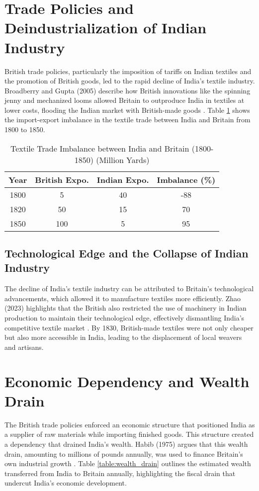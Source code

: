 \documentclass[9pt,twocolumn,twoside]{opticajnl}
\begin{document}
\section{Trade Policies and Deindustrialization of Indian Industry}
British trade policies, particularly the imposition of tariffs on Indian textiles and the promotion of British goods, led to the rapid decline of India’s textile industry. Broadberry and Gupta (2005) describe how British innovations like the spinning jenny and mechanized looms allowed Britain to outproduce India in textiles at lower costs, flooding the Indian market with British-made goods \cite{broadberry2005cotton}. Table \ref{table:textile_trade} shows the import-export imbalance in the textile trade between India and Britain from 1800 to 1850.

\begin{table}[h!]
\centering
\begin{tabular}{|c|c|c|c|}
\hline
\textbf{Year} & \textbf{British Expo.} & \textbf{Indian Expo.} & \textbf{Imbalance (\%)} \\
\hline
1800 & 5 & 40 & -88 \\
1820 & 50 & 15 & 70 \\
1850 & 100 & 5 & 95 \\
\hline
\end{tabular}
\caption{Textile Trade Imbalance between India and Britain (1800-1850) (Million Yards)}
\label{table:textile_trade}
\end{table}

\subsection{Technological Edge and the Collapse of Indian Industry}
The decline of India’s textile industry can be attributed to Britain’s technological advancements, which allowed it to manufacture textiles more efficiently. Zhao (2023) highlights that the British also restricted the use of machinery in Indian production to maintain their technological edge, effectively dismantling India’s competitive textile market \cite{zhao2023colonialism}. By 1830, British-made textiles were not only cheaper but also more accessible in India, leading to the displacement of local weavers and artisans.

\section{Economic Dependency and Wealth Drain}
The British trade policies enforced an economic structure that positioned India as a supplier of raw materials while importing finished goods. This structure created a dependency that drained India’s wealth. Habib (1975) argues that this wealth drain, amounting to millions of pounds annually, was used to finance Britain’s own industrial growth \cite{habib1975colonization}. Table \ref{table:wealth_drain} outlines the estimated wealth transferred from India to Britain annually, highlighting the fiscal drain that undercut India’s economic development.
\end{document}
